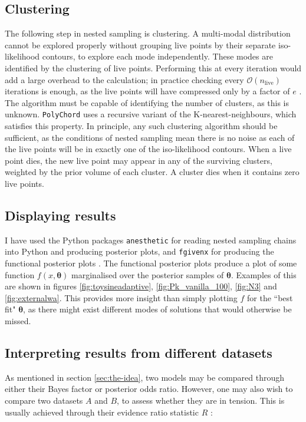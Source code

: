 \documentclass{article}
\begin{document}
\subsection{Clustering}

The following step in nested sampling is clustering. A multi-modal distribution cannot be explored properly without grouping live points by their separate iso-likelihood contours, to explore each mode independently. These modes are identified by the clustering of live points. Performing this at every iteration would add a large overhead to the calculation; in practice checking every $\mathcal{O}(n_\textrm{live})$ iterations is enough, as the live points will have compressed only by a factor of $e$ \cite{PolyChord_1}. The algorithm must be capable of identifying the number of clusters, as this is unknown. \texttt{PolyChord} uses a recursive variant of the K-nearest-neighbours, which satisfies this property. In principle, any such clustering algorithm should be sufficient, as the conditions of nested sampling mean there is no noise as each of the live points will be in exactly one of the iso-likelihood contours. When a live point dies, the new live point may appear in any of the surviving clusters, weighted by the prior volume of each cluster. A cluster dies when it contains zero live points.

\subsection{Displaying results}

I have used the Python packages \texttt{anesthetic} for reading nested sampling chains into Python and producing posterior plots, and \texttt{fgivenx} for producing the functional posterior plots \cite{anesthetic, fgivenx}. The functional posterior plots produce a plot of some function $f(x, \bm\theta)$ marginalised over the posterior samples of $\bm\theta$. Examples of this are shown in figures \ref{fig:toysineadaptive}, 
\ref{fig:Pk_vanilla_100}, \ref{fig:N3} and \ref{fig:externalwa}. This provides more insight than simply plotting $f$ for the ``best fit" $\bm\theta$, as there might exist different modes of solutions that would otherwise be missed.

\subsection{Interpreting results from different datasets}

As mentioned in section \ref{sec:the-idea}, two models may be compared through either their Bayes factor or posterior odds ratio. However, one may also wish to compare two datasets $A$ and $B$, to assess whether they are in tension. This is usually achieved through their evidence ratio statistic $R$ \cite{Marshall_2006}:
\end{document}
